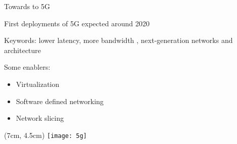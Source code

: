 \begin{frame}{Towards to 5G}

  First deployments of 5G expected around 2020

  \vfill{}

  Keywords: lower latency, more bandwidth , next-generation networks and
  architecture

  \vfill{}

  Some enablers:
  \begin{itemize}
    \item Virtualization
    \item Software defined networking
    \item Network slicing
  \end{itemize}


  \begin{textblock*}{1cm}(7cm, 4.5cm)
    \texttt{[image: 5g]}
  \end{textblock*}

\end{frame}